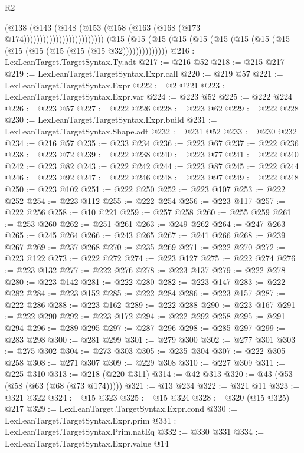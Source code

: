 \begin{lexlean}{R2}
\begin{coremodule}
                                      (@138
                                        (@143
                                          (@148
                                            (@153
                                              (@158 (@163 (@168 (@173 @174)))))))))))))))))))))))))
    (@15 (@15 (@15 (@15 (@15 (@15 (@15 (@15 (@15 (@15 (@15 (@15 (@15 (@15 @32))))))))))))))
@216 := LexLeanTarget.TargetSyntax.Ty.adt
@217 := @216 @52
@218 := @215 @217
@219 := LexLeanTarget.TargetSyntax.Expr.call
@220 := @219 @57
@221 := LexLeanTarget.TargetSyntax.Expr
@222 := @2 @221
@223 := LexLeanTarget.TargetSyntax.Expr.var
@224 := @223 @52
@225 := @222 @224
@226 := @223 @57
@227 := @222 @226
@228 := @223 @62
@229 := @222 @228
@230 := LexLeanTarget.TargetSyntax.Expr.build
@231 := LexLeanTarget.TargetSyntax.Shape.adt
@232 := @231 @52
@233 := @230 @232
@234 := @216 @57
@235 := @233 @234
@236 := @223 @67
@237 := @222 @236
@238 := @223 @72
@239 := @222 @238
@240 := @223 @77
@241 := @222 @240
@242 := @223 @82
@243 := @222 @242
@244 := @223 @87
@245 := @222 @244
@246 := @223 @92
@247 := @222 @246
@248 := @223 @97
@249 := @222 @248
@250 := @223 @102
@251 := @222 @250
@252 := @223 @107
@253 := @222 @252
@254 := @223 @112
@255 := @222 @254
@256 := @223 @117
@257 := @222 @256
@258 := @10 @221
@259 := @257 @258
@260 := @255 @259
@261 := @253 @260
@262 := @251 @261
@263 := @249 @262
@264 := @247 @263
@265 := @245 @264
@266 := @243 @265
@267 := @241 @266
@268 := @239 @267
@269 := @237 @268
@270 := @235 @269
@271 := @222 @270
@272 := @223 @122
@273 := @222 @272
@274 := @223 @127
@275 := @222 @274
@276 := @223 @132
@277 := @222 @276
@278 := @223 @137
@279 := @222 @278
@280 := @223 @142
@281 := @222 @280
@282 := @223 @147
@283 := @222 @282
@284 := @223 @152
@285 := @222 @284
@286 := @223 @157
@287 := @222 @286
@288 := @223 @162
@289 := @222 @288
@290 := @223 @167
@291 := @222 @290
@292 := @223 @172
@294 := @222 @292 @258
@295 := @291 @294
@296 := @289 @295
@297 := @287 @296
@298 := @285 @297
@299 := @283 @298
@300 := @281 @299
@301 := @279 @300
@302 := @277 @301
@303 := @275 @302
@304 := @273 @303
@305 := @235 @304
@307 := @222 @305 @258
@308 := @271 @307
@309 := @229 @308
@310 := @227 @309
@311 := @225 @310
@313 := @218 (@220 @311)
@314 := @42 @313
@320 := @43 (@53 (@58 (@63 (@68 (@73 @174)))))
@321 := @13 @234
@322 := @321 @11
@323 := @321 @322
@324 := @15 @323
@325 := @15 @324
@328 := @320 (@15 @325) @217
@329 := LexLeanTarget.TargetSyntax.Expr.cond
@330 := LexLeanTarget.TargetSyntax.Expr.prim
@331 := LexLeanTarget.TargetSyntax.Prim.natEq
@332 := @330 @331
@334 := LexLeanTarget.TargetSyntax.Expr.value @14

\end{coremodule}
\end{lexlean}
